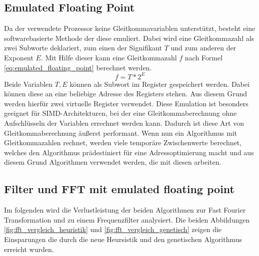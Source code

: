 \subsection{Emulated Floating Point}
\label{chap:emulated_floating_point}
Da der verwendete Prozessor keine Gleitkommavariablen unterstützt, besteht eine softwarebasierte Methode der diese emuliert. Dabei wird eine Gleitkommazahl als zwei Subworte deklariert, zum einen der Signifikant $T$ und zum anderen der Exponent $E$. Mit Hilfe dieser kann eine Gleitkommazahl $f$ nach Formel \ref{eq:emulated_floating_point} berechnet werden.
\begin{equation}
f = T *2^E
\label{eq:emulated_floating_point}
\end{equation}
Beide Variablen $ T,E$ können als Subwort im Register gespeichert werden. Dabei können diese an eine beliebige Adresse des Registers stehen. Aus diesem Grund werden hierfür zwei virtuelle Register verwendet. Diese Emulation ist besonders geeignet für SIMD-Architekturen, bei der eine Gleitkommaberechnung ohne Aufschlüsseln der Variablen errechnet werden kann. Dadurch ist diese Art von Gleitkommaberechnung äußerst performant.
Wenn nun ein Algorithmus mit Gleitkommazahlen rechnet, werden viele temporäre Zwischenwerte berechnet, welches den Algorithmus prädestiniert für eine Adressoptimierung macht und aus diesem Grund Algorithmen verwendet werden, die mit diesen arbeiten. \cite{gerlach2016efficient}

\subsection{Filter und FFT mit emulated floating point}
Im folgenden wird die Verlustleistung der beiden Algorithmen zur Fast Fourier Transformation und zu einem Frequenzfilter analysiert. Die beiden Abbildungen \ref{fig:fft_vergleich_heuristik} und \ref{fig:fft_vergleich_genetisch} zeigen die Einsparungen die durch die neue Heursistik und den genetischen Algorithmus erreicht wurden.

